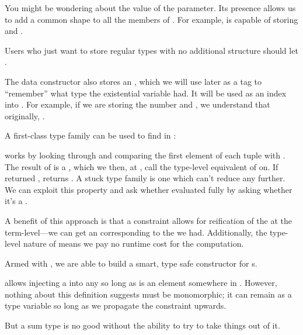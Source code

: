 \documentclass[book.tex]{subfiles}
\begin{document}
You might be wondering about the value of the  parameter. Its presence
allows us to add a common shape to all the members of . For example,
 is capable of storing 
and .

Users who just want to store regular types with no additional structure should
let .

The  data constructor also stores an , which we will use
later as a tag to ``remember'' what type the existential variable  had. It
will be used as an index into . For example, if we are storing the number
 and , we understand that originally, .

A first-class type family can be used to find  in :


 works by looking through  and comparing the first element
of each tuple with . The result of  is a ,
which we then, at , call the type-level equivalent of  on.
If  returned ,  returns . A
stuck type family is one which can't reduce any further. We can exploit this
property and ask whether  evaluated fully by asking whether it's
a .


A benefit of this approach is that a  constraint allows for
reification of the  at the term-level---we can get an 
corresponding to the  we had. Additionally, the type-level nature of
 means we pay no runtime cost for the computation.


Armed with , we are able to build a smart, type safe constructor
for s.


 allows injecting a  into any  so long as
 is an element somewhere in . However, nothing about this
definition suggests  must be monomorphic; it can remain as a type
variable so long as we propagate the  constraint upwards.

But a sum type is no good without the ability to try to take things out of it.
\end{document}
